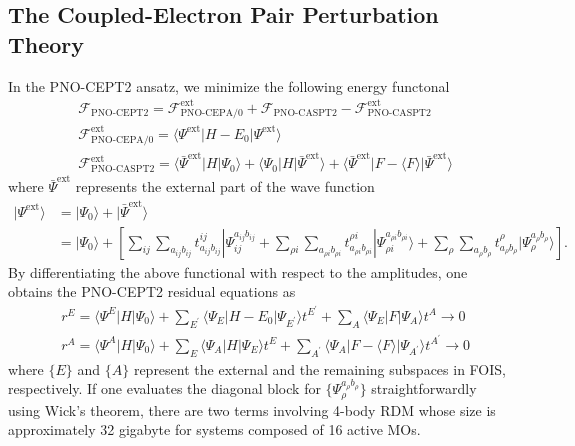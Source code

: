 \documentclass[aip,jcp,amsmath]{revtex4-1}
\begin{document}
\subsection{The Coupled-Electron Pair Perturbation Theory}\label{Subsec:cept2}
%
In the PNO-CEPT2 ansatz, we minimize the following energy functonal
%
\begin{align}
  &\mathscr{F}_\text{PNO-CEPT2} = \mathscr{F}_\text{PNO-CEPA/0}^\text{ext}+\mathscr{F}_\text{PNO-CASPT2}-\mathscr{F}_\text{PNO-CASPT2}^\text{ext} \label{eq:F-CEPT2} \\
  &\mathscr{F}_\text{PNO-CEPA/0}^\text{ext} = \langle\Psi^\text{ext}|H-E_0|\Psi^\text{ext}\rangle \label{eq:F-CEPA/0} \\
  &\mathscr{F}_\text{PNO-CASPT2}^\text{ext} = \langle\bar{\Psi}^\text{ext}|H|\Psi_0\rangle + \langle\Psi_0|H|\bar{\Psi}^\text{ext}\rangle+\langle\bar{\Psi}^\text{ext}|F-\langle F\rangle|\bar{\Psi}^\text{ext}\rangle \label{eq:F-CASPT2}
\end{align}
%
where $\bar{\Psi}^\text{ext}$ represents the external part of the wave function
%
\begin{align}
  |\Psi^\text{ext}\rangle&=|\Psi_0\rangle+|\bar{\Psi}^\text{ext}\rangle \nonumber \\
                         &=|\Psi_0\rangle+\left[\sum_{ij}\sum_{a_{ij}b_{ij}} t_{a_{ij}b_{ij}}^{ij}|\Psi^{a_{ij}b_{ij}}_{ij} + \sum_{\rho i}\sum_{a_{\rho i}b_{\rho i}} t_{a_{\rho i}b_{\rho i}}^{\rho i}|\Psi^{a_{\rho i}b_{\rho i}}_{\rho i}\rangle + \sum_{\rho}\sum_{a_{\rho}b_{\rho}} t_{a_{\rho}b_{\rho}}^{\rho}|\Psi^{a_{\rho}b_{\rho}}_{\rho}\rangle\right].
\end{align}
%
By differentiating the above functional with respect to the amplitudes, one obtains the PNO-CEPT2 residual equations as
%
\begin{align}
  &r^{E}=\langle\Psi^{E}|H|\Psi_0\rangle+\sum_{E^{'}}\langle\Psi_E|H-E_0|\Psi_{E^{'}}\rangle t^{E^{'}}+\sum_{A}\langle\Psi_E|F|\Psi_A\rangle t^A \rightarrow 0 \label{eq:CEPT-E} \\
  &r^{A}=\langle\Psi^{A}|H|\Psi_0\rangle+\sum_{E}\langle\Psi_A|H|\Psi_E\rangle t^E+\sum_{A^{'}}\langle\Psi_A|F-\langle F\rangle|\Psi_{A^{'}}\rangle t^{A^{'}} \rightarrow 0 \label{eq:CEPT-A}
\end{align}
%
where $\{E\}$ and $\{A\}$ represent the external and the remaining subspaces in FOIS, respectively.
%
If one evaluates the diagonal block for $\{\Psi_{\rho}^{a_{\rho}b_{\rho}}\}$ straightforwardly using Wick's theorem, there are two terms involving 4-body RDM whose size is approximately 32 gigabyte for systems composed of 16 active MOs.
\end{document}
